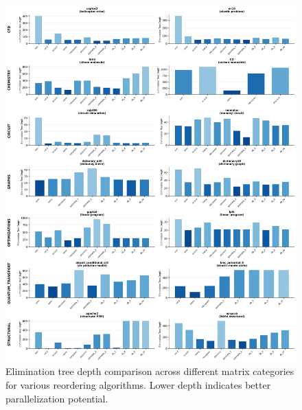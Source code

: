 \begin{figure}[h]
\centering
\includegraphics[width=\textwidth]{fig/res/elimination_tree_depth_all_categories.png}
\caption{Elimination tree depth comparison across different matrix categories for various reordering algorithms. Lower depth indicates better parallelization potential.}
\label{fig:elimination-tree-depth}
\end{figure}




